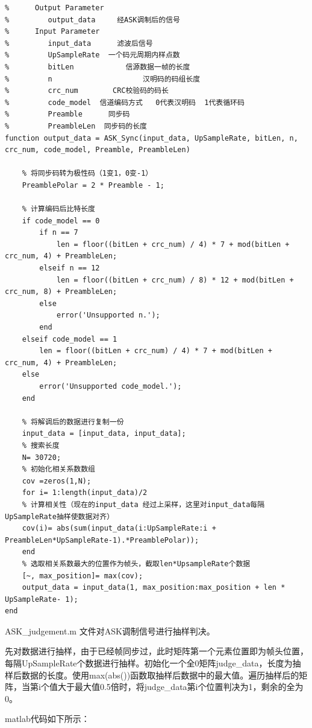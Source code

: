 \documentclass[UTF8]{ctexart}
\begin{document}
\begin{lstlisting}[title=ASK\_Sync.m, frame=shadowbox]
%  Parameter List:       
%      Output Parameter
%         output_data	  经ASK调制后的信号
%      Input Parameter
%         input_data	  滤波后信号
%         UpSampleRate  一个码元周期内样点数
%         bitLen            信源数据一帧的长度
%         n                     汉明码的码组长度
%         crc_num        CRC校验码的码长
%         code_model  信道编码方式   0代表汉明码  1代表循环码
%         Preamble      同步码
%         PreambleLen  同步码的长度
function output_data = ASK_Sync(input_data, UpSampleRate, bitLen, n, crc_num, code_model, Preamble, PreambleLen)

    % 将同步码转为极性码（1变1，0变-1）
    PreamblePolar = 2 * Preamble - 1;
  
    % 计算编码后比特长度
    if code_model == 0
        if n == 7
            len = floor((bitLen + crc_num) / 4) * 7 + mod(bitLen + crc_num, 4) + PreambleLen;
        elseif n == 12
            len = floor((bitLen + crc_num) / 8) * 12 + mod(bitLen + crc_num, 8) + PreambleLen;
        else
            error('Unsupported n.');
        end
    elseif code_model == 1
        len = floor((bitLen + crc_num) / 4) * 7 + mod(bitLen + crc_num, 4) + PreambleLen;
    else
        error('Unsupported code_model.');
    end
    
    % 将解调后的数据进行复制一份
    input_data = [input_data, input_data];
    % 搜索长度
    N= 30720;
    % 初始化相关系数数组
    cov =zeros(1,N);
    for i= 1:length(input_data)/2
    % 计算相关性（现在的input_data 经过上采样，这里对input_data每隔UpSampleRate抽样使数据对齐）
    cov(i)= abs(sum(input_data(i:UpSampleRate:i + PreambleLen*UpSampleRate-1).*PreamblePolar));
    end
    % 选取相关系数最大的位置作为帧头，截取len*UpsampleRate个数据
    [~, max_position]= max(cov);
    output_data = input_data(1, max_position:max_position + len * UpSampleRate- 1);
end
\end{lstlisting}

ASK\_judgement.m 文件对ASK调制信号进行抽样判决。

先对数据进行抽样，由于已经帧同步过，此时矩阵第一个元素位置即为帧头位置，每隔UpSampleRate个数据进行抽样。初始化一个全0矩阵judge\_data，长度为抽样后数据的长度。使用max(abs())函数取抽样后数据中的最大值。遍历抽样后的矩阵，当第i个值大于最大值0.5倍时，将judge\_data第i个位置判决为1，剩余的全为0。

matlab代码如下所示：
\end{document}
